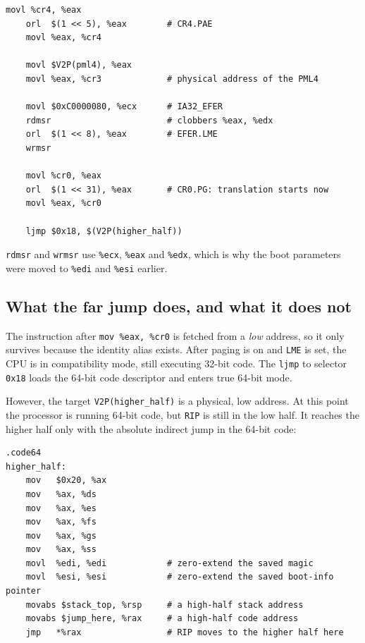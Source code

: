 \begin{lstlisting}[language=gas]
    movl %cr4, %eax
    orl  $(1 << 5), %eax        # CR4.PAE
    movl %eax, %cr4

    movl $V2P(pml4), %eax
    movl %eax, %cr3             # physical address of the PML4

    movl $0xC0000080, %ecx      # IA32_EFER
    rdmsr                       # clobbers %eax, %edx
    orl  $(1 << 8), %eax        # EFER.LME
    wrmsr

    movl %cr0, %eax
    orl  $(1 << 31), %eax       # CR0.PG: translation starts now
    movl %eax, %cr0

    ljmp $0x18, $(V2P(higher_half))
\end{lstlisting}

\texttt{rdmsr} and \texttt{wrmsr} use \texttt{\%ecx}, \texttt{\%eax} and \texttt{\%edx}, which is why the boot parameters were moved to \texttt{\%edi} and \texttt{\%esi} earlier.

\subsection{What the far jump does, and what it does not}

The instruction after \texttt{mov\ \%eax,\ \%cr0} is fetched from a \emph{low} address, so it only survives because the identity alias exists. After paging is on and \texttt{LME} is set, the CPU is in compatibility mode, still executing 32-bit code. The \texttt{ljmp} to selector \texttt{0x18} loads the 64-bit code descriptor and enters true 64-bit mode.

However, the target \texttt{V2P(higher\_half)} is a physical, low address. At this point the processor is running 64-bit code, but \texttt{RIP} is still in the low half. It reaches the higher half only with the absolute indirect jump in the 64-bit code:

\begin{lstlisting}[language=gas]
.code64
higher_half:
    mov   $0x20, %ax
    mov   %ax, %ds
    mov   %ax, %es
    mov   %ax, %fs
    mov   %ax, %gs
    mov   %ax, %ss
    movl  %edi, %edi            # zero-extend the saved magic
    movl  %esi, %esi            # zero-extend the saved boot-info pointer
    movabs $stack_top, %rsp     # a high-half stack address
    movabs $jump_here, %rax     # a high-half code address
    jmp   *%rax                 # RIP moves to the higher half here
\end{lstlisting}

